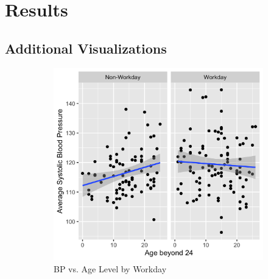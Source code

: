 \documentclass[12pt,twoside,letterpaper]{article}
\theoremstyle{definition}
\theoremstyle{definition}
\begin{document}
\section{Results}\label{sec: results}


\begin{appendices}
    \section{Additional Visualizations}\label{sec: add visuals}

    \begin{figure}[h] 
        \centering
        \begin{subfigure}[b]{0.3\textwidth}
        \centering
        \includegraphics[width=\textwidth]{pics/bp by age and day.png}
        \caption[]%
        {{\small BP vs. Age Level by Workday}}
        \label{fig: bp v age and day}
        \end{subfigure}
        \hfill
        \begin{subfigure}[b]{0.3\textwidth}
        \centering

\end{subfigure}
\end{figure}
\end{appendices}
\end{document}
